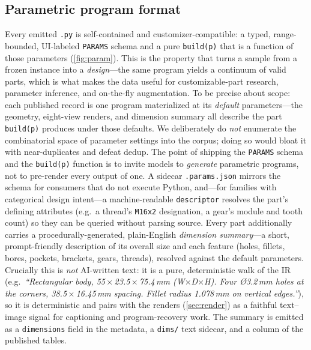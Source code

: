 \documentclass[11pt]{article}
\newcommand{\code}[1]{\texttt{#1}}
\begin{document}
\subsection{Parametric program format}
Every emitted \code{.py} is self-contained and customizer-compatible: a typed,
range-bounded, UI-labeled \code{PARAMS} schema and a pure \code{build(p)} that is
a function of those parameters (\cref{fig:param}). This is the property that turns
a sample from a frozen instance into a \emph{design}---the same program yields a
continuum of valid parts, which is what makes the data useful for customizable-part
research, parameter inference, and on-the-fly augmentation. To be precise about
scope: each published record is one program materialized at its \emph{default}
parameters---the geometry, eight-view renders, and dimension summary all describe
the part \code{build(p)} produces under those defaults. We deliberately do
\emph{not} enumerate the combinatorial space of parameter settings into the
corpus; doing so would bloat it with near-duplicates and defeat dedup. The point
of shipping the \code{PARAMS} schema and the \code{build(p)} function is to invite
models to \emph{generate} parametric programs, not to pre-render every output of
one. A sidecar
\code{.params.json} mirrors the schema for consumers that do not execute Python,
and---for families with categorical design intent---a machine-readable
\code{descriptor} resolves the part's defining attributes (e.g.\ a thread's
\code{M16x2} designation, a gear's module and tooth count) so they can be queried
without parsing source. Every part additionally carries a procedurally-generated,
plain-English \emph{dimension summary}---a short, prompt-friendly description of
its overall size and each feature (holes, fillets, bores, pockets, brackets,
gears, threads), resolved against the default parameters. Crucially this is
\emph{not} AI-written text: it is a pure, deterministic walk of the IR (e.g.\
\textit{``Rectangular body, 55\,$\times$\,23.5\,$\times$\,75.4\,mm (W$\times$D$\times$H).
Four \O3.2\,mm holes at the corners, 38.5\,$\times$\,16.45\,mm spacing. Fillet
radius 1.078\,mm on vertical edges.''}), so it is deterministic and
pairs with the renders (\cref{sec:render}) as a faithful text--image signal for
captioning and program-recovery work. The summary is emitted as a
\code{dimensions} field in the metadata, a \code{dims/} text sidecar, and a column
of the published tables.
\end{document}
